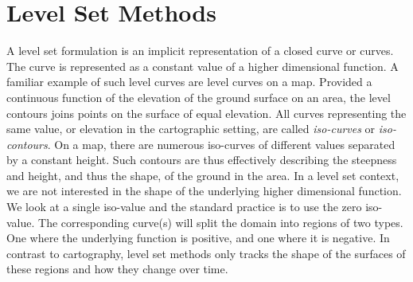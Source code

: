 \chapter{Level Set Methods}
\newcommand{\uxt}{$u(\mathbf{x}, t)$ }

A level set formulation is an implicit representation of a closed curve or curves. 
The curve is represented as a constant value of a higher dimensional function.
A familiar example of such level curves are level curves on a map. Provided 
a continuous function of the elevation of the ground surface on an area, the level
contours joins points on the surface of equal elevation. All curves representing the 
same value, or elevation in the cartographic setting, are called \textit{iso-curves} or
\textit{iso-contours}. On a map, there are numerous iso-curves of different values 
separated by a constant height. Such contours are thus effectively describing
the steepness and height, and thus the shape, of the ground in the area. 
In a level set context, we are not interested in the shape of the underlying 
higher dimensional function. We look at a single iso-value and the standard 
practice is to use the zero iso-value. The corresponding curve(s) will 
split the domain into regions of two types. One where the underlying function is 
positive, and one where it is negative. In contrast to cartography, level set 
methods only tracks the shape of the surfaces of these regions and how they 
change over time.

